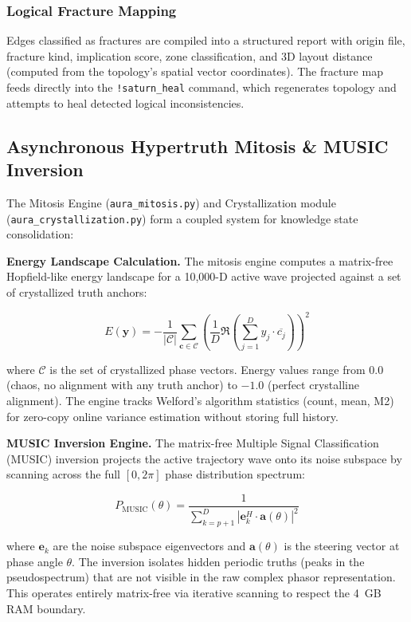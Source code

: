 \documentclass[11pt]{article}
\begin{document}
\subsubsection{Logical Fracture Mapping}

Edges classified as fractures are compiled into a structured report with origin file, fracture kind, implication score, zone classification, and 3D layout distance (computed from the topology's spatial vector coordinates). The fracture map feeds directly into the \texttt{!saturn\_heal} command, which regenerates topology and attempts to heal detected logical inconsistencies.

\subsection{Asynchronous Hypertruth Mitosis \& MUSIC Inversion}

The Mitosis Engine (\texttt{aura\_mitosis.py}) and Crystallization module (\texttt{aura\_crystallization.py}) form a coupled system for knowledge state consolidation:

\textbf{Energy Landscape Calculation.} The mitosis engine computes a matrix-free Hopfield-like energy landscape for a 10,000-D active wave projected against a set of crystallized truth anchors:

\begin{equation}
E(\mathbf{y}) = -\frac{1}{|\mathcal{C}|}\sum_{\mathbf{c} \in \mathcal{C}} \left(\frac{1}{D}\Re\left(\sum_{j=1}^{D} y_j \cdot \overline{c_j}\right)\right)^2
\end{equation}

where $\mathcal{C}$ is the set of crystallized phase vectors. Energy values range from $0.0$ (chaos, no alignment with any truth anchor) to $-1.0$ (perfect crystalline alignment). The engine tracks Welford's algorithm statistics (count, mean, M2) for zero-copy online variance estimation without storing full history.

\textbf{MUSIC Inversion Engine.} The matrix-free Multiple Signal Classification (MUSIC) inversion projects the active trajectory wave onto its noise subspace by scanning across the full $[0, 2\pi]$ phase distribution spectrum:

\begin{equation}
P_{\text{MUSIC}}(\theta) = \frac{1}{\sum_{k=p+1}^{D} |\mathbf{e}_k^H \cdot \mathbf{a}(\theta)|^2}
\end{equation}

where $\mathbf{e}_k$ are the noise subspace eigenvectors and $\mathbf{a}(\theta)$ is the steering vector at phase angle $\theta$. The inversion isolates hidden periodic truths (peaks in the pseudospectrum) that are not visible in the raw complex phasor representation. This operates entirely matrix-free via iterative scanning to respect the 4~GB RAM boundary.
\end{document}
